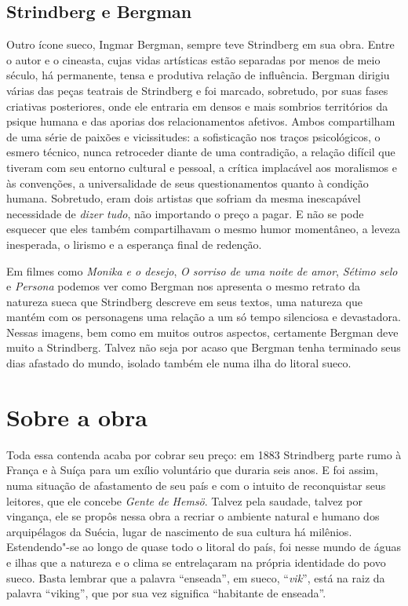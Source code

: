 \subsection{Strindberg e Bergman}

Outro ícone sueco, Ingmar Bergman, sempre teve
Strindberg em sua obra. Entre o autor e o cineasta, cujas vidas
artísticas estão separadas por menos de meio século, há permanente,
tensa e produtiva relação de influência. Bergman dirigiu várias das
peças teatrais de Strindberg e foi marcado, sobretudo, por suas fases
criativas posteriores, onde ele entraria em densos e mais sombrios
territórios da psique humana e das aporias dos relacionamentos
afetivos. Ambos compartilham de uma série de paixões e vicissitudes: a
sofisticação nos traços psicológicos, o esmero técnico, nunca
retroceder diante de uma contradição, a relação difícil que tiveram com
seu entorno cultural e pessoal, a crítica implacável aos moralismos e
às convenções, a universalidade de seus questionamentos quanto à
condição humana. Sobretudo, eram dois artistas que sofriam da mesma
inescapável necessidade de \textit{dizer tudo}, não importando o preço
a pagar. E não se pode esquecer que eles também compartilhavam
o mesmo humor momentâneo, a leveza inesperada, o lirismo e a esperança
final de redenção. 

Em filmes como \textit{Monika e o desejo}, \textit{O sorriso de
uma noite de amor}, \textit{Sétimo selo} e \textit{Persona} podemos ver
como Bergman nos apresenta o mesmo retrato da natureza sueca que
Strindberg descreve em seus textos, uma natureza que mantém com os
personagens uma relação a um só tempo silenciosa e devastadora. Nessas
imagens, bem como em muitos outros aspectos, certamente Bergman deve
muito a Strindberg.  Talvez não seja por acaso que Bergman tenha
terminado seus dias afastado do mundo, isolado também ele numa ilha do
litoral sueco. 


\section{Sobre a obra}

Toda essa contenda acaba por cobrar seu preço: em 1883 Strindberg parte rumo 
à França e à Suíça para um exílio voluntário que duraria seis anos. E foi assim, numa
situação de afastamento de seu país e com o intuito de reconquistar
seus leitores, que ele concebe \textit{Gente de Hemsö}. Talvez pela saudade,
talvez por vingança, ele se propôs nessa obra a recriar o ambiente natural e
humano dos arquipélagos da Suécia, lugar de nascimento de sua cultura
há milênios. Estendendo"-se ao longo de quase todo o litoral do
país, foi nesse mundo de águas e ilhas que a natureza e o clima se
entrelaçaram na própria identidade do povo sueco. Basta lembrar que a
palavra “enseada”, em sueco, “\textit{vik}”, está na raiz da palavra “viking”,
que por sua vez significa “habitante de enseada”. 

